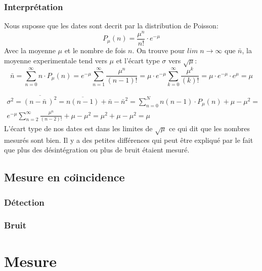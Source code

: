 \documentclass[a4paper,11pt,liststotocnumbered,bibtotocnumbered]{scrartcl}
\begin{document}
   \subsubsection{Interprétation} 
    Nous suposse que les dates sont decrit par la distribution de Poisson:
    \begin{equation*}
     P_{\mu}(n)=\frac{\mu^n}{n!}\cdot e^{-{\mu}}
    \end{equation*}
    Avec la moyenne $\mu$ et le nombre de fois $n$. On trouve pour $lim \; n {\rightarrow}  \infty$ que $\bar{n}$, la moyenne experimentale tend vers $\mu$ et l'écart type $\sigma$ vers $\sqrt{\mu}$:
    \begin{equation*}
     \bar{n}=\sum_{n=0}^{\infty} n \cdot P_{\mu}(n)=e^{-{\mu}}\sum_{n=1}^{\infty}\frac{\mu^n}{(n-1)!}=\mu \cdot  e^{-{\mu}}\sum_{k=0}^{\infty}\frac{\mu^k}{(k)!}=\mu \cdot e^{-{\mu}}\cdot  e^{{\mu}}=\mu
    \end{equation*}

    \begin{equation*}
     \begin{split}
      \sigma^2=\overline{(n-\bar{n}\,)^2}=\overline{n(n-1)}+\bar{n}-{\bar{n}}^2=\sum_{n=0} ^{N} n (n-1)\cdot P_{\mu}(n)+\mu -\mu^2=\\
      e^{-{\mu}}\sum_{n=2}^{\infty}\frac{\mu^n}{(n-2)!}+\mu -\mu^2=\mu^2+ \mu -\mu^2=\mu
     \end{split}
    \end{equation*}
    L'écart type de nos dates est dans les limites de $\sqrt{\mu}$ ce qui dit que les nombres mesurés sont bien. Il y a des petites différences qui peut être expliqué par le fait que plus des désintégration ou plus de bruit étaient mesuré.
   
  

  \subsection{Mesure en co\"{\i}ncidence}
   \subsubsection{Détection}
 

   \subsubsection{Bruit}
 


 \section{Mesure}
\end{document}
